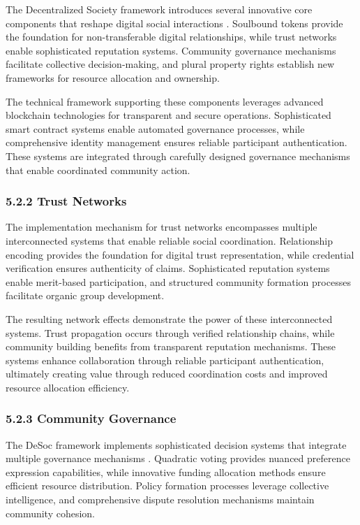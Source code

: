 The Decentralized Society framework introduces several innovative core components that reshape digital social interactions \citep{weyl2022decentralized}. Soulbound tokens provide the foundation for non-transferable digital relationships, while trust networks enable sophisticated reputation systems. Community governance mechanisms facilitate collective decision-making, and plural property rights establish new frameworks for resource allocation and ownership.

The technical framework supporting these components leverages advanced blockchain technologies for transparent and secure operations. Sophisticated smart contract systems enable automated governance processes, while comprehensive identity management ensures reliable participant authentication. These systems are integrated through carefully designed governance mechanisms that enable coordinated community action.

\hypertarget{trust-networks}{%
\subsubsection{5.2.2 Trust Networks}\label{trust-networks}}

The implementation mechanism for trust networks encompasses multiple interconnected systems that enable reliable social coordination. Relationship encoding provides the foundation for digital trust representation, while credential verification ensures authenticity of claims. Sophisticated reputation systems enable merit-based participation, and structured community formation processes facilitate organic group development.

The resulting network effects demonstrate the power of these interconnected systems. Trust propagation occurs through verified relationship chains, while community building benefits from transparent reputation mechanisms. These systems enhance collaboration through reliable participant authentication, ultimately creating value through reduced coordination costs and improved resource allocation efficiency.

\hypertarget{community-governance}{%
\subsubsection{5.2.3 Community Governance}\label{community-governance}}

The DeSoc framework implements sophisticated decision systems that integrate multiple governance mechanisms \citep{weyl2022decentralized}. Quadratic voting provides nuanced preference expression capabilities, while innovative funding allocation methods ensure efficient resource distribution. Policy formation processes leverage collective intelligence, and comprehensive dispute resolution mechanisms maintain community cohesion.

